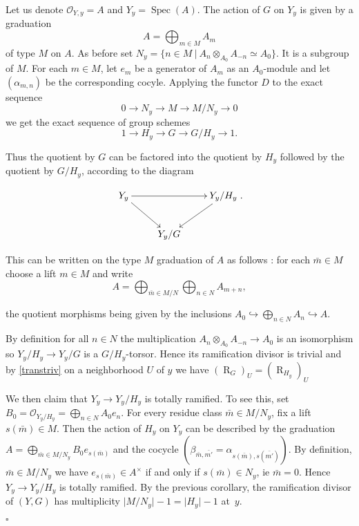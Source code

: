 \documentclass{amsart}
\newenvironment{demo}{{\flushleft \bf Proof~:}}{\hfill $\square$ \vspace{5mm}}
\theoremstyle{definition}
\theoremstyle{remark}
\begin{document}
\begin{demo}

Let us denote ${{\mathcal O}}_{Y,y} = A$ and $Y_y = \operatorname{Spec}(A)$. The action of $G$ on $Y_y$ is given by a graduation \[A = \displaystyle\bigoplus_{m \in M} A_m \] of type $M$ on $A$. As before set $N_y = \{ n \in M \ \vert \ A_n \otimes_{A_0} A_{-n} \simeq A_0 \}$. It is a subgroup of $M$. For each $m \in M$, let $e_m$ be a generator of $A_m$ as an $A_0$-module and let $(\alpha_{m,n})$ be the corresponding cocyle. Applying the functor $D$ to the exact sequence \[ 0 {\longrightarrow} N_y {\longrightarrow} M {\longrightarrow} M/N_y {\longrightarrow} 0 \] we get the exact sequence of group schemes \[ 1 {\longrightarrow} H_y {\longrightarrow} G {\longrightarrow} G/H_y {\longrightarrow} 1 .\]

Thus the quotient by $G$ can be factored into the quotient by $H_y$ followed by the quotient by $G/H_y$, according to the diagram 

\[ \xymatrix{ Y_y \ar[rr] \ar[rd] && Y_y/H_y \ar[ld] \\ & Y_y/G }. \]

This can be written on the type $M$ graduation of $A$ as follows : for each $\bar{m} \in M$ choose a lift $m \in M$ and write \[ A = \displaystyle\bigoplus_{\bar{m} \in M/N} \displaystyle\bigoplus_{n \in N} A_{m+n}, \]

the quotient morphisms being given by the inclusions $A_0 {\hookrightarrow} \displaystyle\bigoplus_{n \in N} A_n {\hookrightarrow} A$.

By definition for all $n \in N$ the multiplication $A_n \otimes_{A_0} A_{-n} {\longrightarrow} A_0$ is an isomorphism so $Y_y/H_y {\longrightarrow} Y_y/G$ is a $G/H_y$-torsor. Hence its ramification divisor is trivial and by \ref{transtriv} on a neighborhood $U$ of $y$ we have $(\operatorname{R}_G)_U = (\operatorname{R}_{H_y})_U$ 

We then claim that $Y_y {\longrightarrow} Y_y/H_y$ is totally ramified. To see this, set $B_0 = {{\mathcal O}}_{Y_y/H_y} = \displaystyle\bigoplus_{n \in N} A_0e_n$. For every residue class $\bar{m} \in M/N_y$, fix a lift $s(\bar{m}) \in M$.
Then the action of $H_y$ on $Y_y$ can be described by the graduation $A = \displaystyle\bigoplus_{\bar{m} \in M/N_y} B_0 e_{s(\bar{m})}$ and the cocycle $(\beta_{\bar{m},\bar{m'}} = \alpha_{s(\bar{m}),s(\bar{m'})})$. By definition, $\bar{m} \in M/N_y$ we have $e_{s(\bar{m})} \in A^\times$ if and only if $s(\bar{m}) \in N_y$, ie $\bar{m} = 0$. Hence $Y_y {\longrightarrow} Y_y/H_y$ is totally ramified. By the previous corollary, the ramification divisor of $(Y,G)$ has multiplicity $\vert M/N_y \vert -1 = \vert H_y \vert -1$ at~$y$.

\end{demo}
\end{document}
